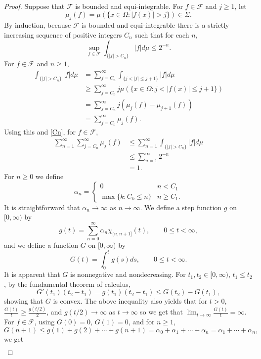\documentclass{article}
\theoremstyle{definition}
\begin{document}
\begin{proof}
Suppose that $\mathscr{F}$ is bounded and equi-integrable. For $f \in \mathscr{F}$ and $j \geq 1$, let
\[
\mu_j(f) = \mu(\{x \in \Omega: |f(x)| > j\}) \in \Sigma.
\]
By induction, because $\mathscr{F}$ is bounded and equi-integrable there is a strictly increasing sequence
of positive integers $C_n$ such that for each $n$, 
\begin{equation}
\sup_{f \in \mathscr{F}} \int_{\{|f| > C_n\}} |f| d\mu \leq 2^{-n}.
\label{Cn}
\end{equation}
For $f \in \mathscr{F}$ and $n \geq 1$,
\begin{align*}
\int_{\{|f| > C_n\}} |f| d\mu&=\sum_{j=C_n}^\infty \int_{\{j < |f| \leq j+1\}} |f| d\mu\\
&\geq \sum_{j=C_n}^\infty j \mu(\{x \in \Omega: j < |f(x)| \leq j+1\})\\
&= \sum_{j=C_n}^\infty j(\mu_j(f)-\mu_{j+1}(f))\\
&=\sum_{j=C_n}^\infty \mu_j(f).
\end{align*}
Using this and \eqref{Cn}, for $f \in \mathscr{F}$,
\begin{align*}
\sum_{n=1}^\infty \sum_{j=C_n}^\infty \mu_j(f)&\leq \sum_{n=1}^\infty \int_{\{|f| > C_n\}} |f| d\mu\\
&\leq \sum_{n=1}^\infty 2^{-n}\\
&=1.
\end{align*}
For $n \geq 0$ we define
\[
\alpha_n = \begin{cases}
0&n<C_1\\
\max\{k : C_k \leq n\}&n \geq C_1.
\end{cases}
\]
It is straightforward that $\alpha_n \to \infty$ as $n \to \infty$.
We define a step function $g$ on $[0,\infty)$ by 
\[
g(t) = \sum_{n=0}^\infty \alpha_n \chi_{(n,n+1]}(t), \qquad 0 \leq t < \infty,
\]
and we define a function $G$ on $[0,\infty)$ by
\[
G(t) = \int_0^t g(s) ds, \qquad 0 \leq t < \infty.
\]
It is apparent that $G$ is nonnegative and nondecreasing. 
For $t_1,t_2 \in [0,\infty)$, $t_1 \leq t_2$, by the fundamental theorem of calculus,
\[
G'(t_1)(t_2-t_1) = g(t_1)(t_2-t_1) \leq G(t_2)-G(t_1),
\]
showing that $G$ is convex. The above inequality also yields that for $t>0$,
$\frac{G(t)}{t} \geq \frac{g(t/2)}{2}$, and  $g(t/2) \to \infty$ as $t \to \infty$ so we get that
$\lim_{t \to \infty} \frac{G(t)}{t} = \infty$. 
For $f \in \mathscr{F}$,
using $G(0)=0$, $G(1)=0$, and for $n \geq 1$, 
\[
G(n+1) \leq g(1)+g(2)+\cdots+g(n+1) = \alpha_0+ \alpha_1+\cdots+\alpha_n
=\alpha_1+\cdots+\alpha_n,
\]
we get
\begin{align*}

\end{align*}
\end{proof}
\end{document}
